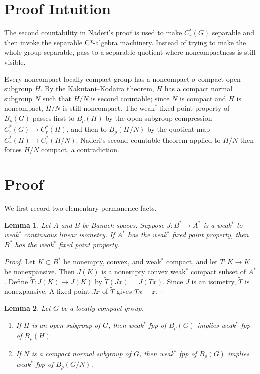 \documentclass[11pt]{article}
\newtheorem{lemma}{Lemma}
\newcommand{\Br}{B_\rho}
\newcommand{\Cr}{C^*_r}
\begin{document}
\section*{Proof Intuition}

The second countability in Naderi's proof is used to make \(\Cr(G)\) separable
and then invoke the separable C*-algebra machinery.  Instead of trying to make
the whole group separable, pass to a separable quotient where noncompactness is
still visible.

Every noncompact locally compact group has a noncompact \(\sigma\)-compact open
subgroup \(H\).  By the Kakutani--Kodaira theorem, \(H\) has a compact normal
subgroup \(N\) such that \(H/N\) is second countable; since \(N\) is compact and
\(H\) is noncompact, \(H/N\) is still noncompact.  The weak\(^*\) fixed point
property of \(\Br(G)\) passes first to \(\Br(H)\) by the open-subgroup
compression \(\Cr(G)\to\Cr(H)\), and then to \(\Br(H/N)\) by the quotient map
\(\Cr(H)\to\Cr(H/N)\).  Naderi's second-countable theorem applied to \(H/N\)
then forces \(H/N\) compact, a contradiction.

\section*{Proof}

We first record two elementary permanence facts.

\begin{lemma}
\label{lem:dual-subspace}
Let \(A\) and \(B\) be Banach spaces.  Suppose
\(J:B^*\to A^*\) is a weak\(^*\)-to-weak\(^*\) continuous linear isometry.  If
\(A^*\) has the weak\(^*\) fixed point property, then \(B^*\) has the weak\(^*\)
fixed point property.
\end{lemma}

\begin{proof}
Let \(K\subset B^*\) be nonempty, convex, and weak\(^*\) compact, and let
\(T:K\to K\) be nonexpansive.  Then \(J(K)\) is a nonempty convex weak\(^*\)
compact subset of \(A^*\).  Define \(\widetilde T:J(K)\to J(K)\) by
\(\widetilde T(Jx)=J(Tx)\).  Since \(J\) is an isometry, \(\widetilde T\) is
nonexpansive.  A fixed point \(Jx\) of \(\widetilde T\) gives \(Tx=x\).
\end{proof}

\begin{lemma}
\label{lem:permanence}
Let \(G\) be a locally compact group.

\begin{enumerate}
\item If \(H\) is an open subgroup of \(G\), then weak\(^*\) fpp of \(\Br(G)\)
implies weak\(^*\) fpp of \(\Br(H)\).
\item If \(N\) is a compact normal subgroup of \(G\), then weak\(^*\) fpp of
\(\Br(G)\) implies weak\(^*\) fpp of \(\Br(G/N)\).
\end{enumerate}
\end{lemma}
\end{document}
